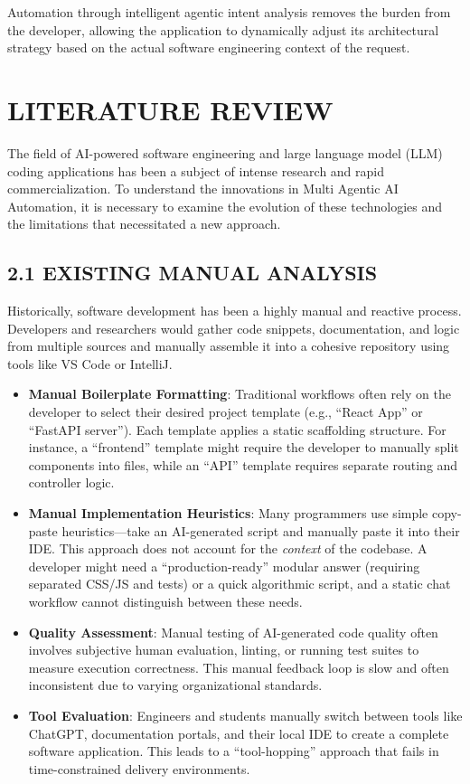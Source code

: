 \documentclass[
  12pt,
]{article}
\providecommand{\tightlist}{%
  \setlength{\itemsep}{0pt}\setlength{\parskip}{0pt}}
\begin{document}
Automation through intelligent agentic intent analysis removes the
burden from the developer, allowing the application to dynamically
adjust its architectural strategy based on the actual software
engineering context of the request.

\newpage

\section{LITERATURE REVIEW}\label{literature-review}

The field of AI-powered software engineering and large language model
(LLM) coding applications has been a subject of intense research and
rapid commercialization. To understand the innovations in Multi Agentic
AI Automation, it is necessary to examine the evolution of these
technologies and the limitations that necessitated a new approach.

\subsection{2.1 EXISTING MANUAL
ANALYSIS}\label{existing-manual-analysis}

Historically, software development has been a highly manual and reactive
process. Developers and researchers would gather code snippets,
documentation, and logic from multiple sources and manually assemble it
into a cohesive repository using tools like VS Code or IntelliJ.

\begin{itemize}
\tightlist
\item
  \textbf{Manual Boilerplate Formatting}: Traditional workflows often
  rely on the developer to select their desired project template (e.g.,
  ``React App'' or ``FastAPI server''). Each template applies a static
  scaffolding structure. For instance, a ``frontend'' template might
  require the developer to manually split components into files, while
  an ``API'' template requires separate routing and controller logic.
\item
  \textbf{Manual Implementation Heuristics}: Many programmers use simple
  copy-paste heuristics---take an AI-generated script and manually paste
  it into their IDE. This approach does not account for the
  \emph{context} of the codebase. A developer might need a
  ``production-ready'' modular answer (requiring separated CSS/JS and
  tests) or a quick algorithmic script, and a static chat workflow
  cannot distinguish between these needs.
\item
  \textbf{Quality Assessment}: Manual testing of AI-generated code
  quality often involves subjective human evaluation, linting, or
  running test suites to measure execution correctness. This manual
  feedback loop is slow and often inconsistent due to varying
  organizational standards.
\item
  \textbf{Tool Evaluation}: Engineers and students manually switch
  between tools like ChatGPT, documentation portals, and their local IDE
  to create a complete software application. This leads to a
  ``tool-hopping'' approach that fails in time-constrained delivery
  environments.
\end{itemize}
\end{document}
